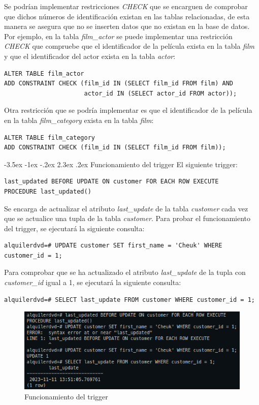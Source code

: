 \documentclass{report}
\makeatletter
\renewcommand\chapter{\@startsection{chapter}{0}{\z@}%
    {-3.5ex \@plus -1ex \@minus -.2ex}%
    {2.3ex \@plus.2ex}%
    {\normalfont\Large\bfseries}}
\makeatother
\begin{document}
Se podrían implementar restricciones \emph{CHECK} que se encarguen de comprobar que dichos
números de identificación existan en las tablas relacionadas, de esta manera se asegura que no se inserten datos que
no existan en la base de datos. Por ejemplo, en la tabla \emph{film\_actor} se puede implementar una restricción
\emph{CHECK} que compruebe que el identificador de la película exista en la tabla \emph{film} y que el identificador
del actor exista en la tabla \emph{actor}:
\begin{verbatim} 
ALTER TABLE film_actor
ADD CONSTRAINT CHECK (film_id IN (SELECT film_id FROM film) AND
                      actor_id IN (SELECT actor_id FROM actor));
\end{verbatim}

Otra restricción que se podría implementar es que el identificador de la película en la tabla \emph{film\_category}
exista en la tabla \emph{film}:
\begin{verbatim}
ALTER TABLE film_category
ADD CONSTRAINT CHECK (film_id IN (SELECT film_id FROM film));
\end{verbatim}


\chapter{Funcionamiento del trigger}
El siguiente trigger:
\begin{verbatim}
last_updated BEFORE UPDATE ON customer FOR EACH ROW EXECUTE
PROCEDURE last_updated()
\end{verbatim}

Se encarga de actualizar el atributo \emph{last\_update} de la tabla \emph{customer} cada vez que se actualice una
tupla de la tabla \emph{customer}. Para probar el funcionamiento del trigger, se ejecutará la siguiente consulta:
\begin{verbatim}
alquilerdvd=# UPDATE customer SET first_name = 'Cheuk' WHERE customer_id = 1;
\end{verbatim}

Para comprobar que se ha actualizado el atributo \emph{last\_update} de la tupla con \emph{customer\_id} igual a 1,
se ejecutará la siguiente consulta:
\begin{verbatim}
alquilerdvd=# SELECT last_update FROM customer WHERE customer_id = 1;
\end{verbatim}

\begin{figure}[H]
  \centering
  \includegraphics[scale=0.60]{img/trigger.png}
  \caption{Funcionamiento del trigger}
  \label{fig:funcionamiento del trigger}
\end{figure}
\end{document}
